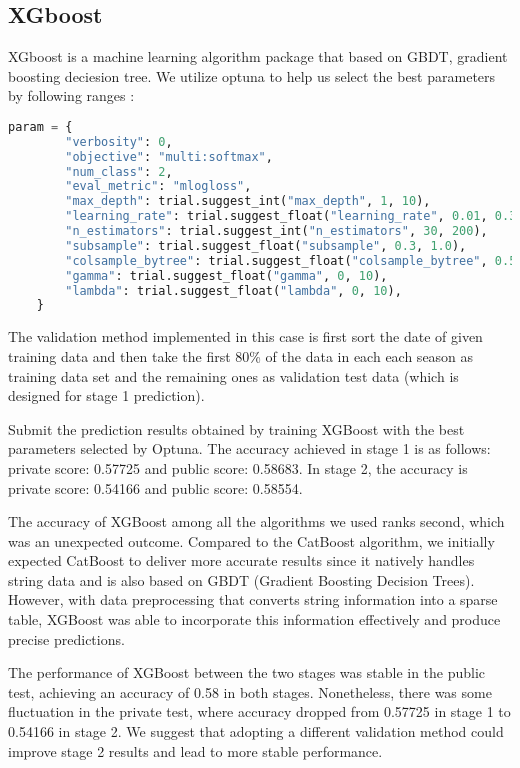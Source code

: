 \subsection*{XGboost}
\quad XGboost is a machine learning algorithm package that based on GBDT, gradient boosting deciesion tree. 
We utilize optuna to help us select the best parameters by following ranges :
\begin{lstlisting}[language=Python]
    param = {
        "verbosity": 0,
        "objective": "multi:softmax",
        "num_class": 2,
        "eval_metric": "mlogloss",
        "max_depth": trial.suggest_int("max_depth", 1, 10),
        "learning_rate": trial.suggest_float("learning_rate", 0.01, 0.3),
        "n_estimators": trial.suggest_int("n_estimators", 30, 200),
        "subsample": trial.suggest_float("subsample", 0.3, 1.0),
        "colsample_bytree": trial.suggest_float("colsample_bytree", 0.5, 1.0),
        "gamma": trial.suggest_float("gamma", 0, 10),
        "lambda": trial.suggest_float("lambda", 0, 10),
    }
\end{lstlisting}
\quad The validation method implemented in this case is first sort the date of given training data and then take the first 80\% 
of the data in each each season as training data set and the remaining ones as validation test data (which is designed for stage 1 prediction).

Submit the prediction results obtained by training XGBoost with the best parameters selected by Optuna. 
The accuracy achieved in stage 1 is as follows: private score: 0.57725 and public score: 0.58683. In stage 2,
 the accuracy is private score: 0.54166 and public score: 0.58554. 

 The accuracy of XGBoost among all the algorithms we used ranks second, which was an unexpected outcome. Compared to the CatBoost algorithm, we initially expected CatBoost to deliver more accurate results since it natively handles string data and is also based on GBDT (Gradient Boosting Decision Trees). However, with data preprocessing that converts string information into a sparse table, XGBoost was able to incorporate this information effectively and produce precise predictions.

The performance of XGBoost between the two stages was stable in the public test, achieving an accuracy of 0.58 in both stages. Nonetheless, there was some fluctuation in the private test, where accuracy dropped from 0.57725 in stage 1 to 0.54166 in stage 2. We suggest that adopting a different validation method could improve stage 2 results and lead to more stable performance.

